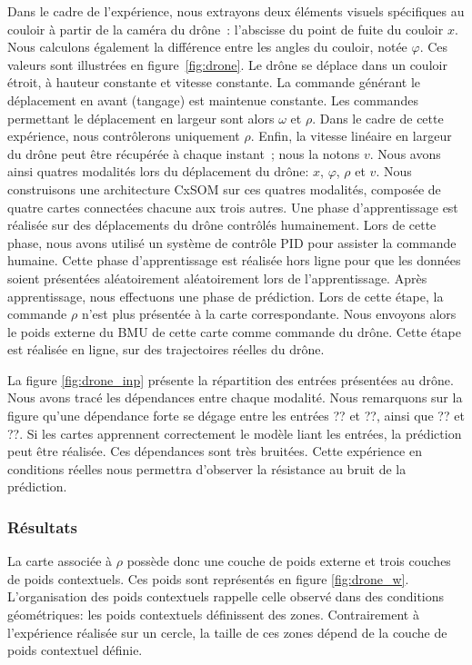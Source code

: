 \documentclass[../main]{subfiles}
\begin{document}
Dans le cadre de l'expérience, nous extrayons deux éléments visuels spécifiques au couloir à partir de la caméra du drône~: l'abscisse du point de fuite du couloir $x$. Nous calculons également la différence entre les angles du couloir, notée $\varphi$. Ces valeurs sont illustrées en figure~\ref{fig:drone}.
Le drône se déplace dans un couloir étroit, à hauteur constante et vitesse constante.
La commande générant le déplacement en avant (tangage) est maintenue constante. Les commandes permettant le déplacement en largeur sont alors $\omega$ et $\rho$. Dans le cadre de cette expérience, nous contrôlerons uniquement $\rho$.
Enfin, la vitesse linéaire en largeur du drône peut être récupérée à chaque instant~; nous la notons $v$.
Nous avons ainsi quatres modalités lors du déplacement du drône: $x$, $\varphi$, $\rho$ et $v$.
Nous construisons une architecture CxSOM sur ces quatres modalités, composée de quatre cartes connectées chacune aux trois autres.
Une phase d'apprentissage est réalisée sur des déplacements du drône contrôlés humainement. Lors de cette phase, nous avons utilisé un système de contrôle PID pour assister la commande humaine. 
Cette phase d'apprentissage est réalisée hors ligne pour que les données soient présentées aléatoirement aléatoirement lors de l'apprentissage.
Après apprentissage, nous effectuons une phase de prédiction. Lors de cette étape, la commande $\rho$ n'est plus présentée à la carte correspondante. Nous envoyons alors le poids externe du BMU de cette carte comme commande du drône. Cette étape est réalisée en ligne, sur des trajectoires réelles du drône.

La figure \ref{fig:drone_inp} présente la répartition des entrées présentées au drône. Nous avons tracé les dépendances entre chaque modalité. Nous remarquons sur la figure qu'une dépendance forte se dégage entre les entrées ?? et ??, ainsi que ?? et ??. Si les cartes apprennent correctement le modèle liant les entrées, la prédiction peut être réalisée.
Ces dépendances sont très bruitées. Cette expérience en conditions réelles nous permettra d'observer la résistance au bruit de la prédiction.


\subsubsection{Résultats}
La carte associée à $\rho$ possède donc une couche de poids externe et trois couches de poids contextuels. Ces poids sont représentés en figure \ref{fig:drone_w}. L'organisation des poids contextuels rappelle celle observé dans des conditions géométriques: les poids contextuels définissent des zones. Contrairement à l'expérience réalisée sur un cercle, la taille de ces zones dépend de la couche de poids contextuel définie. 
\end{document}
